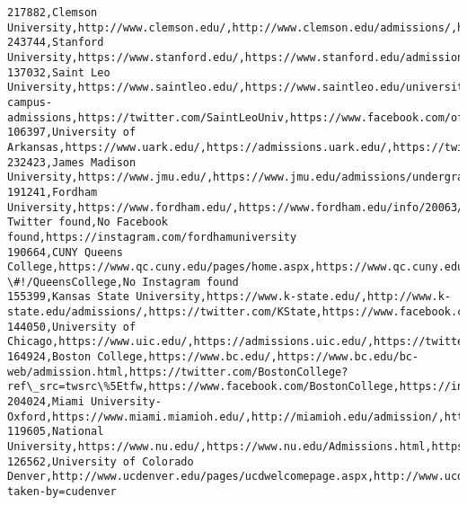 \documentclass[11pt]{article}
\begin{document}
\begin{Verbatim}[commandchars=\\\{\}]
217882,Clemson University,http://www.clemson.edu/,http://www.clemson.edu/admissions/,http://twitter.com/clemsonuniv,http://www.facebook.com/clemsonuniv,http://instagram.com/clemsonuniversity
243744,Stanford University,https://www.stanford.edu/,https://www.stanford.edu/admission/,http://twitter.com/stanford,http://www.facebook.com/stanford,http://instagram.com/stanford
137032,Saint Leo University,https://www.saintleo.edu/,https://www.saintleo.edu/university-campus-admissions,https://twitter.com/SaintLeoUniv,https://www.facebook.com/officialsaintleo,https://www.instagram.com/saintleouniv/
106397,University of Arkansas,https://www.uark.edu/,https://admissions.uark.edu/,https://twitter.com/uarkansas,https://www.facebook.com/UofArkansas,https://instagram.com/uarkansas
232423,James Madison University,https://www.jmu.edu/,https://www.jmu.edu/admissions/undergrad/index.shtml,https://twitter.com/JMU,https://www.facebook.com/jamesmadisonuniversity/,https://www.instagram.com/jamesmadisonuniversity/
191241,Fordham University,https://www.fordham.edu/,https://www.fordham.edu/info/20063/undergraduate\_admission,No Twitter found,No Facebook found,https://instagram.com/fordhamuniversity
190664,CUNY Queens College,https://www.qc.cuny.edu/pages/home.aspx,https://www.qc.cuny.edu/admissions/Pages/default.aspx,https://twitter.com/QC\_News,https://www.facebook.com/home.php?\#!/QueensCollege,No Instagram found
155399,Kansas State University,https://www.k-state.edu/,http://www.k-state.edu/admissions/,https://twitter.com/KState,https://www.facebook.com/KState,https://www.instagram.com/p/BpaHXM5FovA/
144050,University of Chicago,https://www.uic.edu/,https://admissions.uic.edu/,https://twitter.com/thisisuic,https://www.facebook.com/uic.edu,https://instagram.com/uicamiridis/
164924,Boston College,https://www.bc.edu/,https://www.bc.edu/bc-web/admission.html,https://twitter.com/BostonCollege?ref\_src=twsrc\%5Etfw,https://www.facebook.com/BostonCollege,https://instagram.com/bostoncollege/
204024,Miami University-Oxford,https://www.miami.miamioh.edu/,http://miamioh.edu/admission/,https://www.twitter.com/PresGreg,https://www.facebook.com/75387987874/posts/10156188279557875,https://www.instagram.com/p/BorznObh7o5/
119605,National University,https://www.nu.edu/,https://www.nu.edu/Admissions.html,https://twitter.com/natuniv,https://www.facebook.com/nationaluniversity,https://www.instagram.com/nationaluniversity/
126562,University of Colorado Denver,http://www.ucdenver.edu/pages/ucdwelcomepage.aspx,http://www.ucdenver.edu/admissions/Pages/index.aspx,https://twitter.com/cudenver,https://www.facebook.com/events/286008635457845/,https://www.instagram.com/p/BozRl4dH9aK/?taken-by=cudenver

\end{Verbatim}
\end{document}
